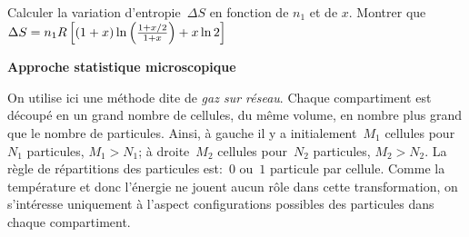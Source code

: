 \documentclass[utf8, 11pt]{feuille}
\begin{document}
\question
Calculer la variation d'entropie~$\Delta S$ en fonction de $n_1$ et de $x$. Montrer que $\Delta S= n_1 R\left[ (1+x )\ln  \left( {1 + {x/2} \over 1 + x } \right)  + x\ln 2 \right]$


\medskip

{\sffamily\bfseries{Approche statistique microscopique}}

On utilise ici une méthode dite de {\em gaz sur réseau}.
Chaque compartiment est découpé en un grand nombre de cellules, du 
même volume, en nombre
plus grand que le nombre de particules.
Ainsi, à gauche il y a initialement~$M_1$ cellules pour~$N_1$
particules, $M_1>N_1$; à droite~$M_2$ cellules pour~$N_2$ particules, $M_2>N_2$.
La règle de répartitions des particules est:~$0$ ou~$1$ particule par cellule. Comme la température et donc l'énergie ne jouent aucun rôle dans cette transformation, on s'intéresse uniquement à l'aspect configurations possibles des particules dans chaque compartiment.
\end{document}

